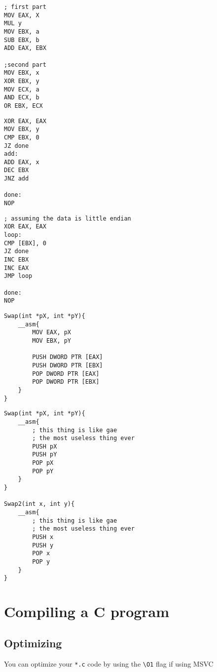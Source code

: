 \documentclass[11pt,letterpaper]{article}
\begin{document}

\begin{verbatim}
; first part
MOV EAX, X
MUL y
MOV EBX, a
SUB EBX, b
ADD EAX, EBX

;second part
MOV EBX, x
XOR EBX, y
MOV ECX, a
AND ECX, b
OR EBX, ECX
\end{verbatim}

\pagebreak
{}
\begin{verbatim}
XOR EAX, EAX
MOV EBX, y
CMP EBX, 0
JZ done
add:	
ADD EAX, x
DEC EBX
JNZ add

done:
NOP
\end{verbatim}
\begin{verbatim}
; assuming the data is little endian
XOR EAX, EAX
loop: 
CMP [EBX], 0
JZ done
INC EBX
INC EAX
JMP loop

done:
NOP
\end{verbatim}

\begin{verbatim}
Swap(int *pX, int *pY){
	__asm{
		MOV EAX, pX
		MOV EBX, pY

		PUSH DWORD PTR [EAX]
		PUSH DWORD PTR [EBX]
		POP DWORD PTR [EAX]
		POP DWORD PTR [EBX]
	}
}
\end{verbatim}

\pagebreak

\begin{verbatim}
Swap(int *pX, int *pY){
	__asm{
		; this thing is like gae
		; the most useless thing ever
		PUSH pX
		PUSH pY
		POP pX
		POP pY
	}
}

Swap2(int x, int y){
	__asm{
		; this thing is like gae
		; the most useless thing ever
		PUSH x 
		PUSH y 
		POP x
		POP y
	}
}
\end{verbatim}


\section*{Compiling a C program}
\subsection*{Optimizing}
You can optimize your \texttt{*.c} code by using the \texttt{\textbackslash O1} flag if using MSVC
\end{document}
